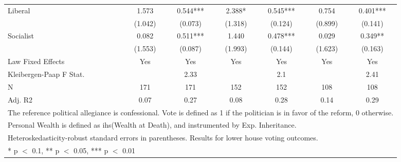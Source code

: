 \begin{table}
\begin{tabular}[t]{lcccccc}
Liberal & \num{1.573} & \num{0.544}*** & \num{2.388}* & \num{0.545}*** & \num{0.754} & \num{0.401}***\\
 & (\num{1.042}) & (\num{0.073}) & (\num{1.318}) & (\num{0.124}) & (\num{0.899}) & (\num{0.141})\\
Socialist & \num{0.082} & \num{0.511}*** & \num{1.440} & \num{0.478}*** & \num{0.029} & \num{0.349}**\\
 & (\num{1.553}) & (\num{0.087}) & (\num{1.993}) & (\num{0.144}) & (\num{1.623}) & (\num{0.163})\\
\midrule
Law Fixed Effects & Yes & Yes & Yes & Yes & Yes & Yes\\
Kleibergen-Paap F Stat. &  & 2.33 &  & 2.1 &  & 2.41\\
N & \num{171} & \num{171} & \num{152} & \num{152} & \num{108} & \num{108}\\
Adj. R2 & \num{0.07} & \num{0.27} & \num{0.08} & \num{0.28} & \num{0.14} & \num{0.29}\\
\bottomrule
\multicolumn{7}{l}{\rule{0pt}{1em}The reference political allegiance is confessional. Vote is defined as 1 if the politician is in favor of the reform, 0 otherwise.}\\
\multicolumn{7}{l}{\rule{0pt}{1em}Personal Wealth is defined as ihs(Wealth at Death), and instrumented by Exp. Inheritance.}\\
\multicolumn{7}{l}{\rule{0pt}{1em}Heteroskedasticity-robust standard errors in parentheses. Results for lower house voting outcomes.}\\
\multicolumn{7}{l}{\rule{0pt}{1em}* p $<$ 0.1, ** p $<$ 0.05, *** p $<$ 0.01}\\
\end{tabular}
\end{table}
